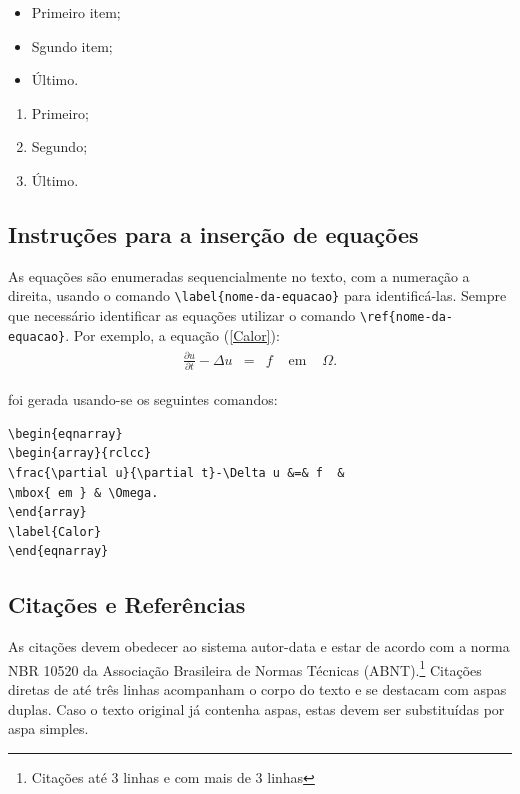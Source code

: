 \documentclass[a4,12pt]{modelo}
\begin{document}
\begin{itemize} 
\item Primeiro item; 
\item Sgundo item; 
\item Último.
\end{itemize} 

\begin{enumerate} 
\item Primeiro; 
\item Segundo;
\item Último.
\end{enumerate}
 
\subsection{Instruções para a inserção de equações}

As equações são enumeradas sequencialmente no texto, com a numeração a direita, usando o 
comando \verb!\label{nome-da-equacao}! para identificá-las. Sempre que necessário identificar 
as equações utilizar o comando \verb!\ref{nome-da-equacao}!. 
Por exemplo, a equação (\ref{Calor}): 
%
%
\begin{eqnarray}
\begin{array}{rclcc}
\frac{\partial u}{\partial t}-\Delta u &=& f  & \mbox{ em } & \Omega. 
\end{array}
\label{Calor}
\end{eqnarray}


foi gerada usando-se os seguintes comandos: 
\begin{verbatim}
\begin{eqnarray}
\begin{array}{rclcc}
\frac{\partial u}{\partial t}-\Delta u &=& f  &  
\mbox{ em } & \Omega. 
\end{array}
\label{Calor}
\end{eqnarray}
\end{verbatim}  
 
 
\subsection{Citações e Referências} 
  
As citações devem obedecer ao sistema autor-data e estar de acordo com a norma NBR 10520 da Associação Brasileira de Normas Técnicas (ABNT).\footnote{Citações até 3 linhas e com mais de 3 linhas} 
Citações diretas de até três linhas acompanham o corpo do texto e se destacam com aspas duplas. Caso o texto original já contenha aspas, estas devem ser substituídas por aspa simples. 
\end{document}

